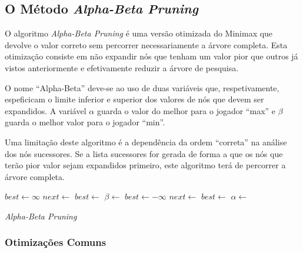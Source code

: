 \documentclass[12pt,a4paper,oneside]{article}
\begin{document}
\subsection{O Método \textit{Alpha-Beta Pruning}}

O algoritmo \emph{Alpha-Beta Pruning} é uma versão otimizada do Minimax que devolve o valor correto sem percorrer necessariamente a árvore completa. Esta otimização consiste em não expandir nós que tenham um valor pior que outros já vistos anteriormente e efetivamente reduzir a árvore de pesquisa.

O nome ``Alpha-Beta'' deve-se ao uso de duas variáveis que, respetivamente, espeficicam o limite inferior e superior dos valores de nós que devem ser expandidos\cite{Russell:AI:2003}. A variável $\alpha$ guarda o valor do melhor para o jogador ``max'' e $\beta$ guarda o melhor valor para o jogador ``min''.

Uma limitação deste algoritmo é a dependência da ordem ``correta'' na análise dos nós sucessores. Se a lista sucessores for gerada de forma a que os nós que terão pior valor sejam expandidos primeiro, este algoritmo terá de percorrer a árvore completa.

\begin{algorithm}
\begin{algorithmic}
   
  \EndIf
      \State $best \gets \infty$
          \State $next \gets$ 
          \State $best \gets$ 
              \State{}
          \EndIf
          \State $\beta \gets$ 
      \EndFor
      \State $best \gets -\infty$
          \State $next \gets$ 
          \State $best \gets$ 
              \State{}
          \EndIf
          \State $\alpha \gets$ 
      \EndFor
  \EndIf
  \State{} 
\EndFunction
\end{algorithmic}
\caption{\emph{Alpha-Beta Pruning}}
\end{algorithm}

\subsubsection{Otimizações Comuns}
\end{document}
